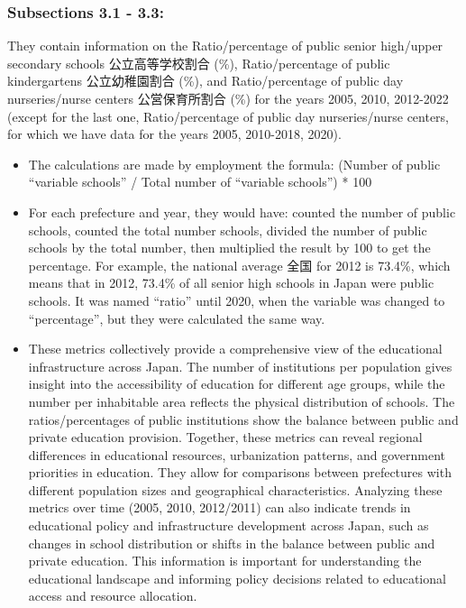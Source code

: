 \documentclass[
  12pt,
  letterpaper,
  DIV=11,
  numbers=noendperiod]{scrartcl}
\begin{document}
\hypertarget{subsections-3.1---3.3}{%
\subsubsection{Subsections 3.1 - 3.3:}\label{subsections-3.1---3.3}}

They contain information on the Ratio/percentage of public senior
high/upper secondary schools 公立高等学校割合 (\%), Ratio/percentage of
public kindergartens 公立幼稚園割合 (\%), and Ratio/percentage of public
day nurseries/nurse centers 公営保育所割合 (\%) for the years 2005,
2010, 2012-2022 (except for the last one, Ratio/percentage of public day
nurseries/nurse centers, for which we have data for the years 2005,
2010-2018, 2020).

\begin{itemize}
\item
  The calculations are made by employment the formula: (Number of public
  ``variable schools'' / Total number of ``variable schools'') * 100
\item
  For each prefecture and year, they would have: counted the number of
  public schools, counted the total number schools, divided the number
  of public schools by the total number, then multiplied the result by
  100 to get the percentage. For example, the national average 全国 for
  2012 is 73.4\%, which means that in 2012, 73.4\% of all senior high
  schools in Japan were public schools. It was named ``ratio'' until
  2020, when the variable was changed to ``percentage'', but they were
  calculated the same way.
\item
  These metrics collectively provide a comprehensive view of the
  educational infrastructure across Japan. The number of institutions
  per population gives insight into the accessibility of education for
  different age groups, while the number per inhabitable area reflects
  the physical distribution of schools. The ratios/percentages of public
  institutions show the balance between public and private education
  provision. Together, these metrics can reveal regional differences in
  educational resources, urbanization patterns, and government
  priorities in education. They allow for comparisons between
  prefectures with different population sizes and geographical
  characteristics. Analyzing these metrics over time (2005, 2010,
  2012/2011) can also indicate trends in educational policy and
  infrastructure development across Japan, such as changes in school
  distribution or shifts in the balance between public and private
  education. This information is important for understanding the
  educational landscape and informing policy decisions related to
  educational access and resource allocation.
\end{itemize}
\end{document}

